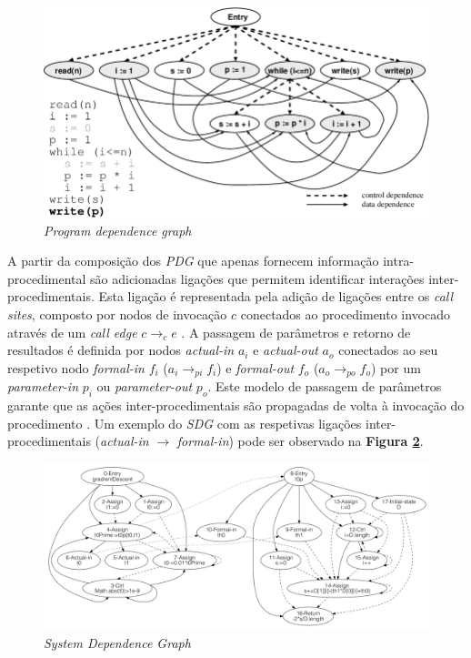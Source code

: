     \begin{figure}[h]
     	\begin{center}
     		\includegraphics[width=\textwidth]{img/pdg.png}
     	\end{center}
     	\caption{\textit{Program dependence graph}}
     	\label{fig:pdg}
 	\end{figure}
 	
 	A partir da composição dos \textit{PDG} que apenas fornecem informação intra-procedimental são adicionadas ligações que permitem identificar interações inter-procedimentais. Esta ligação é representada pela adição de ligações entre os \textit{call sites}, composto por nodos de invocação $c$ conectados ao procedimento invocado através de um \textit{call edge} $c \rightarrow _ce$ \citep{graf10_sdg_generation}. A passagem de parâmetros e retorno de resultados é definida por nodos \textit{actual-in} $a_i$ e \textit{actual-out} $a_o$ conectados ao seu respetivo nodo \textit{formal-in} $f_i$ ($a_i \rightarrow _{pi} f_i$) e \textit{formal-out} $f_o$ ($a_o \rightarrow _{po} f_o$) por um \textit{parameter-in} $p_i$ ou \textit{parameter-out} $p_o$. Este modelo de passagem de parâmetros garante que as ações inter-procedimentais são propagadas de volta à invocação do procedimento \citep{graf10_sdg_generation}. Um exemplo do \textit{SDG} com as respetivas ligações inter-procedimentais (\textit{actual-in} $\rightarrow$ \textit{formal-in}) pode ser observado na \textbf{Figura \ref{fig:sdg_exemplo}}.
    
     \begin{figure}[h]
     	\begin{center}
     		\includegraphics[width=\textwidth]{img/sdg_exemplo.png}
     	\end{center}
     	\caption{\textit{System Dependence Graph}}
     	\label{fig:sdg_exemplo}
 	\end{figure}
    

    
    
    
    

    
    
    
    
    
    
    